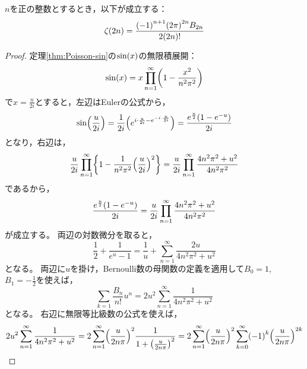 \documentclass[a4paper,draft]{ltjsarticle}
\begin{document}
\begin{thm}[正の偶数点$z=2n$における$\fun{\zeta}{z}$の特殊値]\label{thm:RiemannZeta-2n}
    $n$を正の整数とするとき，以下が成立する：
    \begin{equation}
        \fun{\zeta}{2n}=\frac{\pare{-1}^{n+1}\pare{2\pi}^{2n}B_{2n}}{2\pare{2n}!}
    \end{equation}
    \begin{proof}
        定理\ref{thm:Poisson-sin}の$\fun{\sin}{x}$の無限積展開：
        \begin{equation}
            \fun{\sin}{x}= x\prod_{n=1}^\infty \pare{1-\dfrac{x^2}{n^2\pi^2}}
        \end{equation}
        で$x=\frac{u}{2i}$とすると，左辺はEulerの公式から，
        \begin{equation}
            \fun{\sin}{\frac{u}{2i}}=\frac{1}{2i}\pare{e^{i\cdot \frac{u}{2i}-e^{-i\cdot \frac{u}{2i}}}}=\frac{e^{\frac{u}{2}}\pare{1-e^{-u}}}{2i}
        \end{equation}
        となり，右辺は，
        \begin{equation}
            \frac{u}{2i}\prod_{n=1}^\infty \bra{1-\frac{1}{n^2\pi^2}\pare{\frac{u}{2i}}^2}=\frac{u}{2i}\prod_{n=1}^\infty \frac{4n^2\pi^2+u^2}{4n^2\pi^2}
        \end{equation}
        であるから，
        \begin{equation}
            \frac{e^{\frac{u}{2}}\pare{1-e^{-u}}}{2i}=\frac{u}{2i}\prod_{n=1}^\infty \frac{4n^2\pi^2+u^2}{4n^2\pi^2}
        \end{equation}
        が成立する。
        両辺の対数微分を取ると，
        \begin{equation}
            \frac{1}{2}+\frac{1}{e^u-1}=\frac{1}{u}+\sum_{n=1}^\infty \frac{2u}{4n^2\pi^2+u^2}
        \end{equation}
        となる。
        両辺に$u$を掛け，Bernoulli数の母関数の定義を適用して$B_0=1$, $B_1=-\frac{1}{2}$を使えば，
        \begin{equation}
            \sum_{k=1}\frac{B_n}{n!}u^n=2u^2\sum_{n=1}^\infty \frac{1}{4n^2\pi^2+u^2}
        \end{equation}
        となる。
        右辺に無限等比級数の公式を使えば，
        \begin{equation}
            2u^2\sum_{n=1}^\infty \frac{1}{4n^2\pi^2+u^2}
            =2\sum_{n=1}^\infty \pare{\frac{u}{2n\pi}}^2\frac{1}{1+\pare{\frac{u}{2n\pi}}^2}
            =2\sum_{n=1}^\infty \pare{\frac{u}{2n\pi}}^2\sum_{k=0}^\infty \pare{-1}^k\pare{\frac{u}{2n\pi}}^{2k}

\end{equation}
\end{proof}
\end{thm}
\end{document}
